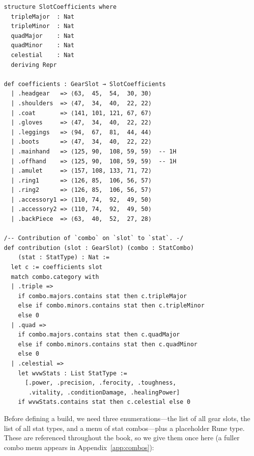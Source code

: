 \documentclass[11pt, a4paper, oneside]{book}
\newcommand{\li}[1]{{\ttfamily\small\color{deepblue}#1}}
\begin{document}
\begin{leanbox}[title={Lean 4 --- Stat Coefficients}]
\begin{verbatim}
structure SlotCoefficients where
  tripleMajor  : Nat
  tripleMinor  : Nat
  quadMajor    : Nat
  quadMinor    : Nat
  celestial    : Nat
  deriving Repr

def coefficients : GearSlot → SlotCoefficients
  | .headgear   => ⟨63,  45,  54,  30, 30⟩
  | .shoulders  => ⟨47,  34,  40,  22, 22⟩
  | .coat       => ⟨141, 101, 121, 67, 67⟩
  | .gloves     => ⟨47,  34,  40,  22, 22⟩
  | .leggings   => ⟨94,  67,  81,  44, 44⟩
  | .boots      => ⟨47,  34,  40,  22, 22⟩
  | .mainhand   => ⟨125, 90,  108, 59, 59⟩  -- 1H
  | .offhand    => ⟨125, 90,  108, 59, 59⟩  -- 1H
  | .amulet     => ⟨157, 108, 133, 71, 72⟩
  | .ring1      => ⟨126, 85,  106, 56, 57⟩
  | .ring2      => ⟨126, 85,  106, 56, 57⟩
  | .accessory1 => ⟨110, 74,  92,  49, 50⟩
  | .accessory2 => ⟨110, 74,  92,  49, 50⟩
  | .backPiece  => ⟨63,  40,  52,  27, 28⟩

/-- Contribution of `combo` on `slot` to `stat`. -/
def contribution (slot : GearSlot) (combo : StatCombo)
    (stat : StatType) : Nat :=
  let c := coefficients slot
  match combo.category with
  | .triple =>
    if combo.majors.contains stat then c.tripleMajor
    else if combo.minors.contains stat then c.tripleMinor
    else 0
  | .quad =>
    if combo.majors.contains stat then c.quadMajor
    else if combo.minors.contains stat then c.quadMinor
    else 0
  | .celestial =>
    let wvwStats : List StatType :=
      [.power, .precision, .ferocity, .toughness,
       .vitality, .conditionDamage, .healingPower]
    if wvwStats.contains stat then c.celestial else 0
\end{verbatim}
\end{leanbox}

Before defining a build, we need three enumerations---the list of all gear
slots, the list of all stat types, and a menu of stat combos---plus a
placeholder \li{Rune} type.  These are referenced throughout the book, so we
give them once here (a fuller combo menu appears in Appendix~\ref{app:combos}):
\end{document}
